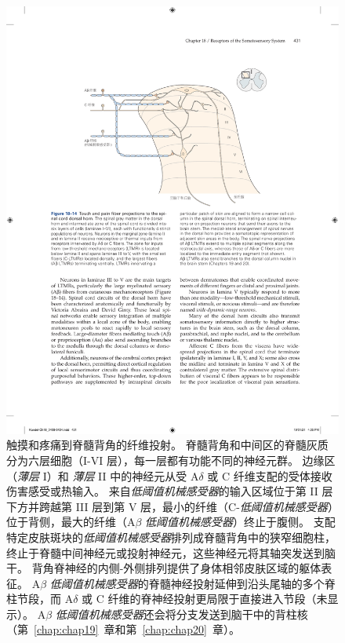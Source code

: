 \begin{figure}[htbp]
	\centering
	\includegraphics[width=1.0\linewidth]{chap18/fig_18_14}
	\caption{触摸和疼痛到脊髓背角的纤维投射。
		脊髓背角和中间区的脊髓灰质分为六层细胞（I-VI 层），每一层都有功能不同的神经元群。
		边缘区（\textit{薄层} I）和 \textit{薄层} II 中的神经元从受 A$\delta$ 或 C 纤维支配的受体接收伤害感受或热输入。 
		来自\textit{低阈值机械感受器}的输入区域位于第 II 层下方并跨越第 III 层到第 V 层，最小的纤维（C-\textit{低阈值机械感受器}）位于背侧，最大的纤维（A$\beta$ \textit{低阈值机械感受器}）终止于腹侧。
		支配特定皮肤斑块的\textit{低阈值机械感受器}排列成脊髓背角中的狭窄细胞柱，终止于脊髓中间神经元或投射神经元，这些神经元将其轴突发送到脑干。
		背角脊神经的内侧-外侧排列提供了身体相邻皮肤区域的躯体表征。
		A$\beta$ \textit{低阈值机械感受器}的脊髓神经投射延伸到沿头尾轴的多个脊柱节段，而 A$\delta$ 或 C 纤维的脊神经投射更局限于直接进入节段（未显示）。
		A$\beta$ \textit{低阈值机械感受器}还会将分支发送到脑干中的背柱核（第~\ref{chap:chap19}~章和第~\ref{chap:chap20}~章）。}
	\label{fig:18_14}
\end{figure}


